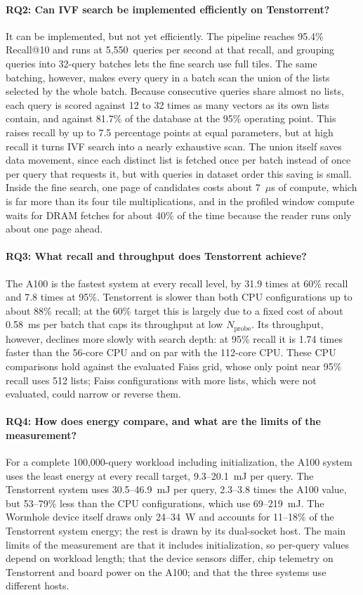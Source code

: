 \paragraph{RQ2: Can IVF search be implemented efficiently on Tenstorrent?}
It can be implemented, but not yet efficiently. The pipeline reaches 95.4\%
Recall@10 and runs at 5,550~queries per second at that recall, and grouping
queries into 32-query batches lets the fine search use full tiles. The same
batching, however, makes every query in a batch scan the union of the lists
selected by the whole batch. Because consecutive queries share almost no lists,
each query is scored against 12 to 32 times as many vectors as its own lists
contain, and against 81.7\% of the database at the 95\% operating point. This
raises recall by up to 7.5 percentage points at equal parameters, but at high
recall it turns IVF search into a nearly exhaustive scan. The union itself
saves data movement, since each distinct list is fetched once per batch
instead of once per query that requests it, but with queries in dataset order
this saving is small. Inside the
fine search, one page of candidates costs about 7~\(\mu\)s of compute, which is
far more than its four tile multiplications, and in the profiled window compute
waits for DRAM fetches for about 40\% of the time because the reader runs only
about one page ahead.

\paragraph{RQ3: What recall and throughput does Tenstorrent achieve?}
The A100 is the fastest system at every recall level, by 31.9 times at 60\%
recall and 7.8 times at 95\%. Tenstorrent is slower than both CPU
configurations up to about 88\% recall; at the 60\% target this is largely
due to a fixed cost of about 0.58~ms per batch that caps its throughput at low
\(N_{\mathrm{probe}}\). Its throughput, however, declines more slowly with
search depth: at 95\% recall it is 1.74 times faster than the 56-core CPU and
on par with the 112-core CPU. These CPU comparisons hold against the evaluated
Faiss grid, whose only point near 95\% recall uses 512 lists; Faiss
configurations with more lists, which were not evaluated, could narrow or reverse them.

\paragraph{RQ4: How does energy compare, and what are the limits of the
measurement?}
For a complete 100,000-query workload including initialization, the A100
system uses the least energy at every recall target, 9.3--20.1~mJ per query.
The Tenstorrent system uses 30.5--46.9~mJ per query, 2.3--3.8 times the A100
value, but 53--79\% less than the CPU configurations, which use
69--219~mJ. The Wormhole device itself draws only 24--34~W and accounts for
11--18\% of the Tenstorrent system energy; the rest is drawn by its dual-socket
host. The main limits of the measurement are that it includes initialization,
so per-query values depend on workload length; that the device sensors differ,
chip telemetry on Tenstorrent and board power on the A100; and that the three
systems use different hosts.

